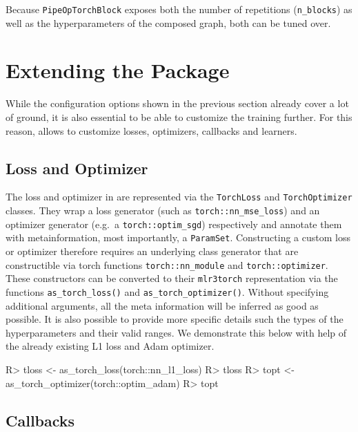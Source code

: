\documentclass[article, nojss]{jss}
\theoremstyle{definition}
\begin{document}
Because \texttt{PipeOpTorchBlock} exposes both the number of repetitions (\texttt{n\_blocks}) as well as the hyperparameters of the composed graph, both can be tuned over.

\section{Extending the Package}\label{sec:extending}

While the configuration options shown in the previous section already cover a lot of ground, it is also essential to be able to customize the training further.
For this reason,  allows to customize losses, optimizers, callbacks and learners.

\subsection{Loss and Optimizer}\label{sec:extending-loss-opt}

The loss and optimizer in are represented via the \texttt{TorchLoss} and \texttt{TorchOptimizer} classes.
They wrap a loss generator (such as \texttt{torch::nn\_mse\_loss}) and an optimizer generator (e.g.~a \texttt{torch::optim\_sgd}) respectively and annotate them with metainformation, most importantly, a \texttt{ParamSet}.
Constructing a custom loss or optimizer therefore requires an underlying class generator that are constructible via torch functions \texttt{torch::nn\_module} and \texttt{torch::optimizer}.
These constructors can be converted to their \texttt{mlr3torch} representation via the functions \texttt{as\_torch\_loss()} and \texttt{as\_torch\_optimizer()}.
Without specifying additional arguments, all the meta information will be inferred as good as possible.
It is also possible to provide more specific details such the types of the hyperparameters and their valid ranges.
We demonstrate this below with help of the already existing L1 loss and Adam optimizer.

\begin{CodeInput}
R> tloss <- as_torch_loss(torch::nn_l1_loss)
R> tloss
R> topt <- as_torch_optimizer(torch::optim_adam) 
R> topt
\end{CodeInput}

\begin{CodeInput}
\end{CodeInput}

\subsection{Callbacks}\label{sec:extending-callbacks}
\end{document}
